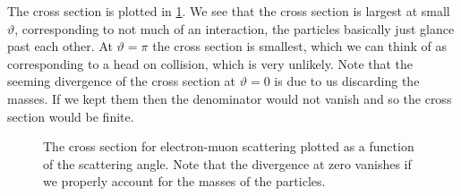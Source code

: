 \documentclass[fleqn]{NotesClass}
\begin{document}
    The cross section is plotted in \cref{fig:electron muon scattering cross section}.
    We see that the cross section is largest at small \(\vartheta\), corresponding to not much of an interaction, the particles basically just glance past each other.
    At \(\vartheta = \pi\) the cross section is smallest, which we can think of as corresponding to a head on collision, which is very unlikely.
    Note that the seeming divergence of the cross section at \(\vartheta = 0\) is due to us discarding the masses.
    If we kept them then the denominator would not vanish and so the cross section would be finite.
    
    \begin{figure}
        \caption[Electron-muon scattering cross section]{The cross section for electron-muon scattering plotted as a function of the scattering angle. Note that the divergence at zero vanishes if we properly account for the masses of the particles.}
        \label{fig:electron muon scattering cross section}
    \end{figure}
    
    
    
    
    
    
    
    
    
    
    
    
    
    
    
    
    
    
    
    
    
    
    
    
    
    
    
    
    
    
    
    
    
\end{document}
